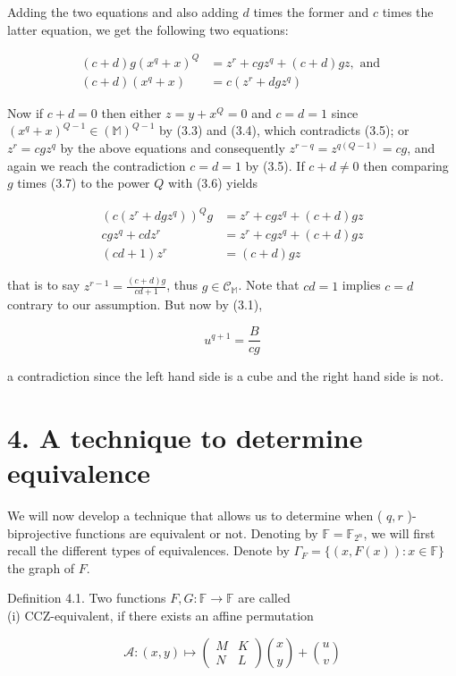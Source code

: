 \documentclass[10pt]{article}
\begin{document}
Adding the two equations and also adding $d$ times the former and $c$ times the latter equation, we get the following two equations:


\begin{align*}
(c+d) g\left(x^{q}+x\right)^{Q} & =z^{r}+c g z^{q}+(c+d) g z, \text { and }  \tag{3.6}\\
(c+d)\left(x^{q}+x\right) & =c\left(z^{r}+d g z^{q}\right) \tag{3.7}
\end{align*}


Now if $c+d=0$ then either $z=y+x^{Q}=0$ and $c=d=1$ since $\left(x^{q}+x\right)^{Q-1} \in(\mathbb{M})^{Q-1}$ by (3.3) and (3.4), which contradicts (3.5); or $z^{r}=c g z^{q}$ by the above equations and consequently $z^{r-q}=z^{q(Q-1)}=c g$, and again we reach the contradiction $c=d=1$ by (3.5). If $c+d \neq 0$ then comparing $g$ times (3.7) to the power $Q$ with (3.6) yields

$$
\begin{aligned}
\left(c\left(z^{r}+d g z^{q}\right)\right)^{Q} g & =z^{r}+c g z^{q}+(c+d) g z \\
c g z^{q}+c d z^{r} & =z^{r}+c g z^{q}+(c+d) g z \\
(c d+1) z^{r} & =(c+d) g z
\end{aligned}
$$

that is to say $z^{r-1}=\frac{(c+d) g}{c d+1}$, thus $g \in \mathcal{C}_{\mathbb{M}}$. Note that $c d=1$ implies $c=d$ contrary to our assumption. But now by (3.1),

$$
u^{q+1}=\frac{B}{c g}
$$

a contradiction since the left hand side is a cube and the right hand side is not.

\section*{4. A technique to determine equivalence}
We will now develop a technique that allows us to determine when ( $q, r$ )-biprojective functions are equivalent or not. Denoting by $\mathbb{F}=\mathbb{F}_{2^{n}}$, we will first recall the different types of equivalences. Denote by $\Gamma_{F}=\{(x, F(x)): x \in \mathbb{F}\}$ the graph of $F$.

Definition 4.1. Two functions $F, G: \mathbb{F} \rightarrow \mathbb{F}$ are called\\
(i) CCZ-equivalent, if there exists an affine permutation

$$
\mathcal{A}:(x, y) \mapsto\left(\begin{array}{cc}
M & K \\
N & L
\end{array}\right)\binom{x}{y}+\binom{u}{v}
$$
\end{document}
